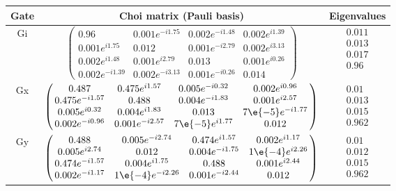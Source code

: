 {\begin{table}[h]
\begin{center}
\begin{tabular}[l]{|c|c|c|}
\hline
Gate & Choi matrix (Pauli basis) & Eigenvalues \\ \hline
Gi & $ \left(\!\!\begin{array}{cccc}
0.96 & 0.001e^{-i1.75} & 0.002e^{-i1.48} & 0.002e^{i1.39} \\ 
0.001e^{i1.75} & 0.012 & 0.001e^{-i2.79} & 0.002e^{i3.13} \\ 
0.002e^{i1.48} & 0.001e^{i2.79} & 0.013 & 0.001e^{i0.26} \\ 
0.002e^{-i1.39} & 0.002e^{-i3.13} & 0.001e^{-i0.26} & 0.014
 \end{array}\!\!\right) $
 & $ \begin{array}{c}
0.011 \\ 
0.013 \\ 
0.017 \\ 
0.96
 \end{array} $
 \\ \hline
Gx & $ \left(\!\!\begin{array}{cccc}
0.487 & 0.475e^{i1.57} & 0.005e^{-i0.32} & 0.002e^{i0.96} \\ 
0.475e^{-i1.57} & 0.488 & 0.004e^{-i1.83} & 0.001e^{i2.57} \\ 
0.005e^{i0.32} & 0.004e^{i1.83} & 0.013 & 7\e{-5}e^{-i1.77} \\ 
0.002e^{-i0.96} & 0.001e^{-i2.57} & 7\e{-5}e^{i1.77} & 0.012
 \end{array}\!\!\right) $
 & $ \begin{array}{c}
0.01 \\ 
0.013 \\ 
0.015 \\ 
0.962
 \end{array} $
 \\ \hline
Gy & $ \left(\!\!\begin{array}{cccc}
0.488 & 0.005e^{-i2.74} & 0.474e^{i1.57} & 0.002e^{i1.17} \\ 
0.005e^{i2.74} & 0.012 & 0.004e^{-i1.75} & 1\e{-4}e^{i2.26} \\ 
0.474e^{-i1.57} & 0.004e^{i1.75} & 0.488 & 0.001e^{i2.44} \\ 
0.002e^{-i1.17} & 1\e{-4}e^{-i2.26} & 0.001e^{-i2.44} & 0.012
 \end{array}\!\!\right) $
 & $ \begin{array}{c}
0.01 \\ 
0.012 \\ 
0.015 \\ 
0.962
 \end{array} $
 \\ \hline
\end{tabular}


\end{center}
\end{table}}
